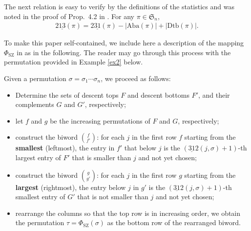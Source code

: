 \documentclass[12pt,reqno]{amsart}
\numberwithin{equation}{section}
\theoremstyle{plain}
\theoremstyle{definition}
\def\Sym{\mathfrak{S}}
\def\SZ{\mathrm{SZ}}
\def\rasc{\mathrm{2\underline{13}}}
\def\rdes{\mathrm{2\underline{31}}}
\def\ldes{\mathrm{\underline{31}2}}
\def\Aba{\mathrm{Aba}}
\def\Dtb{\mathrm{Dtb}}
\begin{document}
The next relation is easy to verify by the definitions of the statistics and was noted in the proof of Prop.~4.2 in \cite{CF23}. For any $\pi\in\Sym_n$,
\begin{align}
\label{eq:diff-213-231}
\rasc(\pi)=\rdes(\pi)-|\Aba(\pi)|+|\Dtb(\pi)|.
\end{align}

To make this paper self-contained, we include here a description of the mapping $\Phi_{\SZ}$ in \cite{SZ10, SZ12} as in the following. The reader may go through this process with the permutation provided in Example \ref{ex2} below.

Given a permutation $\sigma=\sigma_1\cdots \sigma_n$, we proceed as follows:
    \begin{itemize}
    \item Determine the sets of descent tops $F$  and descent bottoms $F'$, and their complements $G$ and $G'$, respectively;
    \item let $f$ and  $g$ be  the  increasing permutations of $F$ and $G$, respectively;
    \item construct the biword $\binom{f}{f'}$: for each $j$ in the first row $f$ starting from the \textbf{smallest} (leftmost), the entry in $f'$ that below $j$ is the $(\ldes(j,\sigma)+1)$-th largest entry of $F'$ that is smaller than $j$ and not yet chosen;
    \item construct the biword $\binom{g}{g'}$: for each $j$ in the first row  $g$ starting from the \textbf{largest} (rightmost), the entry  below $j$ in $g'$ is the $(\ldes(j,\sigma)+1)$-th smallest entry of $G'$ that is not smaller than $j$ and not yet chosen;
    \item rearrange the columns so that the top row is in increasing order,
    we obtain the permutation $\tau=\Phi_{\SZ}(\sigma)$ as the bottom row of the rearranged biword.
\end{itemize}
\end{document}
